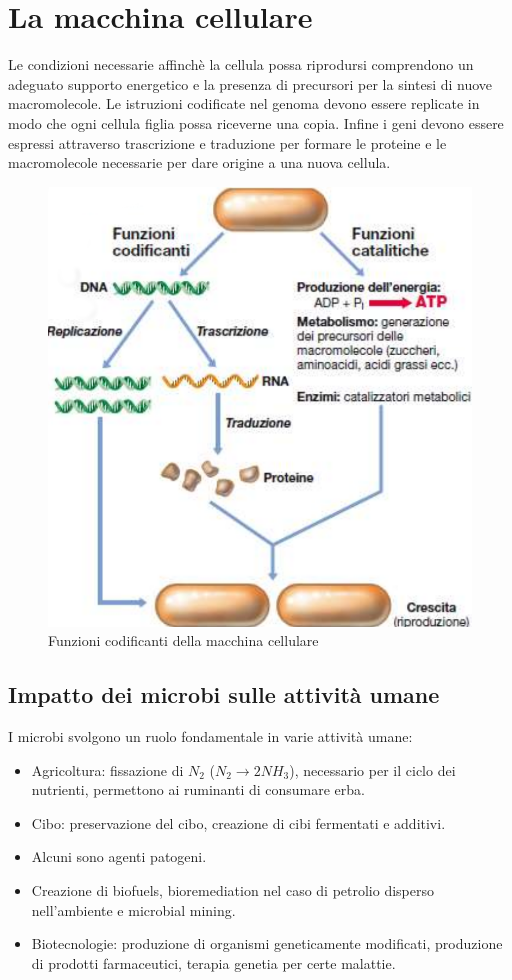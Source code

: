 \section{La macchina cellulare}
Le condizioni necessarie affinch\`e la cellula possa riprodursi comprendono un adeguato supporto energetico e la presenza di precursori per la sintesi di 
nuove macromolecole. Le istruzioni codificate nel genoma devono essere replicate in modo che ogni cellula figlia possa riceverne una copia. Infine i geni
devono essere espressi attraverso trascrizione e traduzione per formare le proteine e le macromolecole necessarie per dare origine a una nuova cellula.
\begin{figure}[h]
\includegraphics{Pictures/MacchinaCellulare.png}
\caption{Funzioni codificanti della macchina cellulare}
\end{figure}
\subsection{Impatto dei microbi sulle attivit\`a umane}
I microbi svolgono un ruolo fondamentale in varie attivit\`a umane:
\begin{itemize}
\item Agricoltura: fissazione di $N_2$ ($N_2\rightarrow 2NH_3$), necessario per il ciclo dei nutrienti, permettono ai ruminanti di consumare erba.
\item Cibo: preservazione del cibo, creazione di cibi fermentati e additivi.
\item Alcuni sono agenti patogeni.
\item Creazione di biofuels, bioremediation nel caso di petrolio disperso nell'ambiente e microbial mining.
\item Biotecnologie: produzione di organismi geneticamente modificati, produzione di prodotti farmaceutici, terapia genetia per certe malattie. 
\end{itemize}
